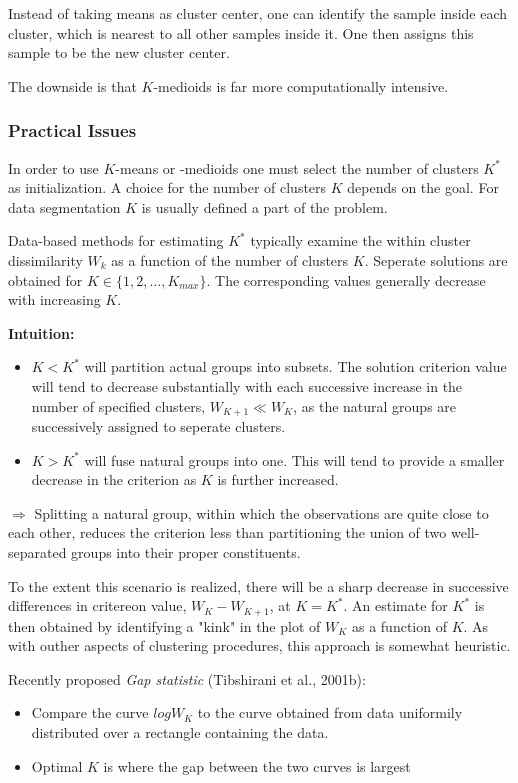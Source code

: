 \documentclass{scrartcl}
\begin{document}
 Instead of taking means as cluster center, one can identify the sample inside each cluster, which is nearest to all other samples inside it. One then assigns this sample to be the new cluster center.

 The downside is that \(K\)-medioids is far more computationally intensive.

 \subsubsection{Practical Issues}
 In order to use \(K\)-means or -medioids one must select the number of clusters \(K^*\) as initialization. A choice for the number of clusters \(K\) depends on the goal. For data segmentation \(K\) is usually defined a part of the problem.

 Data-based methods for estimating \(K^*\) typically examine the within cluster dissimilarity \(W_k\) as a function of the number of clusters \(K\). Seperate solutions are obtained for \(K \in \{1,2,\dots,K_{max}\}\). The corresponding values generally decrease with increasing \(K\). 

\bigbreak
 
\textbf{Intuition:}
\begin{itemize}
    \item
        \(K < K^*\) will partition actual groups into subsets. The solution criterion value will tend to decrease substantially with each successive increase in the number of specified clusters, \(W_{K+1} \ll W_K\), as the natural groups are successively assigned to seperate clusters.
    \item
        \(K > K^*\) will fuse natural groups into one. This will tend to provide a smaller decrease in the criterion as \(K\) is further increased.
\end{itemize}
\(\Rightarrow\) Splitting a natural group, within which the observations are quite close to each other, reduces the criterion less than partitioning the union of two well-separated groups into their proper constituents.

To the extent this scenario is realized, there will be a sharp decrease in successive differences in critereon value, \(W_K - W_{K+1}\), at \(K=K^*\). An estimate for \(K^*\) is then obtained by identifying a "kink" in the plot of \(W_K\) as a function of \(K\). As with outher aspects of clustering procedures, this approach is somewhat heuristic.

Recently proposed \textit{Gap statistic} (Tibshirani et al., 2001b): 
\begin{itemize}
    \item
        Compare the curve \(log W_K\) to the curve obtained from data uniformily distributed over a rectangle containing the data.
    \item
        Optimal \(K\) is where the gap between the two curves is largest
\end{itemize}
                
\end{document}
